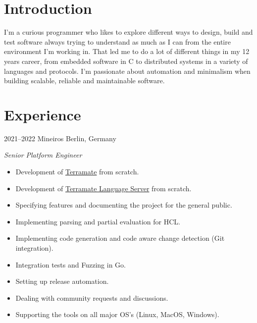 \documentclass[]{friggeri-cv} %
\begin{document}

\section{Introduction}

\begin{entrylist}
\entry
{}
{}
{}
{
I'm a curious programmer who likes to explore different ways to design, build and test software
always trying to understand as much as I can from the entire environment I'm working in.
That led me to do a lot of different things in my 12 years career, from embedded
software in C to distributed systems in a variety of languages and protocols.
I'm passionate about automation and minimalism when building scalable, reliable
and maintainable software.
}
\end{entrylist}


\section{Experience}

\begin{entrylist}
\entry
{2021--2022}
{Mineiros}
{Berlin, Germany}
{\emph{Senior Platform Engineer} \\

\begin{itemize}
  \item Development of {\href{https://github.com/mineiros-io/terramate}{Terramate}} from scratch.
  \item Development of {\href{https://github.com/mineiros-io/terramate-ls}{Terramate Language Server}} from scratch.
  \item Specifying features and documenting the project for the general public.
  \item Implementing parsing and partial evaluation for HCL.
  \item Implementing code generation and code aware change detection (Git integration).
  \item Integration tests and Fuzzing in Go.
  \item Setting up release automation.
  \item Dealing with community requests and discussions.
  \item Supporting the tools on all major OS's (Linux, MacOS, Windows).
\end{itemize}

}
\end{entrylist}
\end{document}
